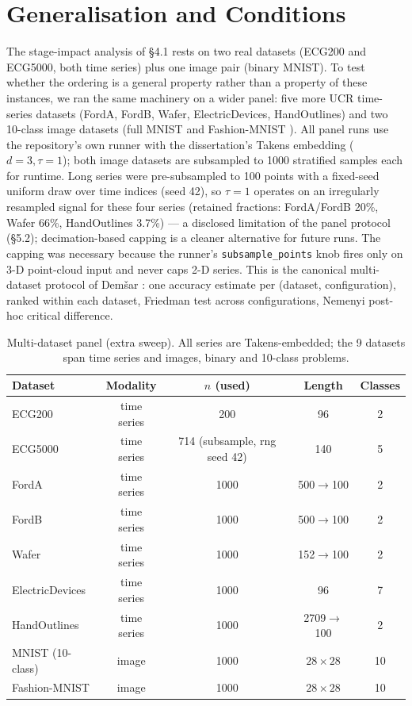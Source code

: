 \documentclass[12pt, a4paper]{report}
\theoremstyle{definition}
\theoremstyle{plain}
\theoremstyle{remark}
\begin{document}
\section{Generalisation and Conditions}

The stage-impact analysis of \S4.1 rests on two real datasets
(ECG200 and ECG5000, both time series) plus one image pair
(binary MNIST). To test whether the ordering is a general property
rather than a property of these instances, we ran the same machinery
on a wider panel: five more UCR time-series datasets (FordA, FordB,
Wafer, ElectricDevices, HandOutlines) and two 10-class image datasets
(full MNIST \cite{lecun1998} and Fashion-MNIST \cite{xiao2017}).
All panel runs use the repository's
own runner with the dissertation's Takens embedding ($d{=}3,\tau{=}1$);
both image datasets are subsampled to 1000 stratified samples each
for runtime. Long series were
pre-subsampled to 100 points with a fixed-seed uniform draw over time
indices (seed 42), so $\tau{=}1$ operates on an irregularly resampled
signal for these four series (retained fractions: FordA/FordB 20\%,
Wafer 66\%, HandOutlines 3.7\%) --- a disclosed limitation of the
panel protocol (\S5.2); decimation-based capping is a cleaner
alternative for future runs. The capping was necessary because the
runner's \texttt{subsample\_points} knob fires only on 3-D
point-cloud input and never caps 2-D series.
This is the canonical multi-dataset protocol of Dem\v{s}ar
\cite{demsar2006}: one
accuracy estimate per (dataset, configuration), ranked within each
dataset, Friedman test across configurations, Nemenyi post-hoc
critical difference.

\begin{table}[H]
  \centering
  \caption{Multi-dataset panel (extra sweep). All series are
  Takens-embedded; the 9 datasets span time series and images,
  binary and 10-class problems.}
  \label{tab:multidataset_panel}
  \footnotesize
  \begin{tabular}{lcccc}
    \toprule
    Dataset & Modality & $n$ (used) & Length & Classes \\
    \midrule
    ECG200 & time series & 200 & 96 & 2 \\
    ECG5000 & time series & 714 (subsample, rng seed 42) & 140 & 5 \\
    FordA & time series & 1000 & 500$\to$100 & 2 \\
    FordB & time series & 1000 & 500$\to$100 & 2 \\
    Wafer & time series & 1000 & 152$\to$100 & 2 \\
    ElectricDevices & time series & 1000 & 96 & 7 \\
    HandOutlines & time series & 1000 & 2709$\to$100 & 2 \\
    MNIST (10-class) & image & 1000 & $28\times28$ & 10 \\
    Fashion-MNIST & image & 1000 & $28\times28$ & 10 \\
    \bottomrule
  \end{tabular}
\end{table}
\end{document}
